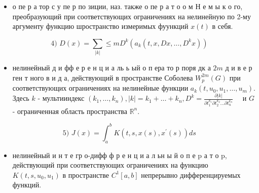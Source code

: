 \documentclass[10pt]{article}
\begin{document}
\begin{itemize}

  \item о пе р а тор с у пе р по зиции, наз. также о пе р а т о о м Н е м ы к о го, преобразующий при соответствующих ограничениях на нелинейную по 2-му аргументу функцию шространство измеримых фуункций $x(t)$ в себя.

\end{itemize}



\[

\text { 4) } D(x)=\sum_{|k|} \leqslant m D^{k}\left(a_{k}\left(t, x, D x, \ldots, D^{k} x\right)\right)

\]



\begin{itemize}

  \item нелинейный д и фф е р е н ц и а ль ь ый о п ера то р поря дк а $2 m$ д и в е р ген т ного в и д а, действующий в пространстве Соболева $W_{p}^{2 m}(G)$ при соответствующих ограничениях на нелинейные функции $a_{k}\left(t, u_{0}, u_{1}, \ldots, u_{m}\right)$. Здесь $k$ - мультииндекс $\left(k_{1}, \ldots, k_{n}\right),|k|=k_{1}+\ldots+k_{n}, D^{k}=\frac{\partial|k|}{\partial t_{1}^{k_{1}} \partial t_{2}^{k_{2}} \ldots \partial t_{n}^{k_{n}}} \quad$ и $G$ - ограниченная область пространства $\mathbb{R}^{n}$.

\end{itemize}



\[

\text { 5) } J(x)=\int_{a}^{b} K\left(t, s, x(s), x^{\prime}(s)\right) d s

\]



\begin{itemize}

  \item нелинейный и н т е гр о-дифф ф р е н ц и а л ьн ы й о п е p а т о p, действующий при соответствующих ограничениях на функцию $K\left(t, s, u_{0}, u_{1}\right)$ в пространстве $C^{1}[a, b]$ непрерывно дифференцируемых функций.

\end{itemize}
\end{document}
